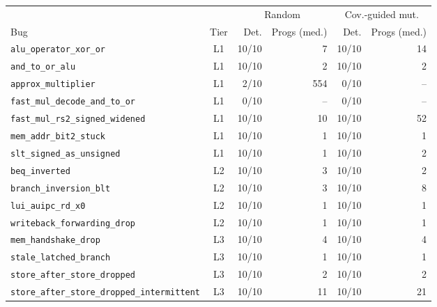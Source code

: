 \begin{tabular}{@{}l c r r r r@{}}\toprule
& & \multicolumn{2}{c}{Random} & \multicolumn{2}{c}{Cov.-guided mut.}\\\cmidrule(lr){3-4}\cmidrule(l){5-6}
Bug & Tier & Det. & Progs (med.) & Det. & Progs (med.)\\\midrule
\texttt{alu\_operator\_xor\_or} & L1 & 10/10 & 7 & 10/10 & 14\\
\texttt{and\_to\_or\_alu} & L1 & 10/10 & 2 & 10/10 & 2\\
\texttt{approx\_multiplier} & L1 & 2/10 & 554 & 0/10 & --\\
\texttt{fast\_mul\_decode\_and\_to\_or} & L1 & 0/10 & -- & 0/10 & --\\
\texttt{fast\_mul\_rs2\_signed\_widened} & L1 & 10/10 & 10 & 10/10 & 52\\
\texttt{mem\_addr\_bit2\_stuck} & L1 & 10/10 & 1 & 10/10 & 1\\
\texttt{slt\_signed\_as\_unsigned} & L1 & 10/10 & 1 & 10/10 & 2\\
\texttt{beq\_inverted} & L2 & 10/10 & 3 & 10/10 & 2\\
\texttt{branch\_inversion\_blt} & L2 & 10/10 & 3 & 10/10 & 8\\
\texttt{lui\_auipc\_rd\_x0} & L2 & 10/10 & 1 & 10/10 & 1\\
\texttt{writeback\_forwarding\_drop} & L2 & 10/10 & 1 & 10/10 & 1\\
\texttt{mem\_handshake\_drop} & L3 & 10/10 & 4 & 10/10 & 4\\
\texttt{stale\_latched\_branch} & L3 & 10/10 & 1 & 10/10 & 1\\
\texttt{store\_after\_store\_dropped} & L3 & 10/10 & 2 & 10/10 & 2\\
\texttt{store\_after\_store\_dropped\_intermittent} & L3 & 10/10 & 11 & 10/10 & 21\\
\bottomrule\end{tabular}